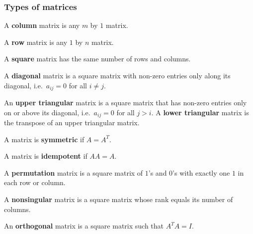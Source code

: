 \documentclass[compress]{beamer}
\theoremstyle{definition}
\begin{document}
\begin{frame}
  \frametitle{Types of matrices}
  \begin{definition}
    A \textbf{column} matrix is any $m$ by $1$ matrix.
  \end{definition}
  
  \begin{definition}
    A \textbf{row} matrix is any $1$ by $n$ matrix.
  \end{definition}
  
  \begin{definition}
    A \textbf{square} matrix has the same number of rows and columns.
  \end{definition}
\end{frame}

\begin{frame}
  \begin{definition}
    A \textbf{diagonal} matrix is a square matrix with non-zero entries
    only along its diagonal, i.e.\ $a_{ij} = 0$ for all $i \neq j$. 
  \end{definition}

  \begin{definition}
    An \textbf{upper triangular} matrix is a square matrix that has
    non-zero entries only on or above its diagonal, i.e.\ $a_{ij} = 0$
    for all $j>i$. A \textbf{lower triangular} matrix is the transpose
    of an upper triangular matrix.
  \end{definition}
  
  \begin{definition}
    A matrix is \textbf{symmetric} if $A = A^T$.
  \end{definition}
\end{frame}

\begin{frame}
  \begin{definition}
    A matrix is \textbf{idempotent} if $AA = A$.
  \end{definition}
  
  \begin{definition}
    A \textbf{permutation} matrix is a square matrix of $1$'s and $0$'s
    with exactly one $1$ in each row or column.  
  \end{definition}
  
  \begin{definition}
    A \textbf{nonsingular} matrix is a square matrix whose rank equals
    its number of columns.
  \end{definition}
  
  \begin{definition}
    An \textbf{orthogonal} matrix is a square matrix such that $A^TA =
    I$.
  \end{definition}
\end{frame}
\end{document}
